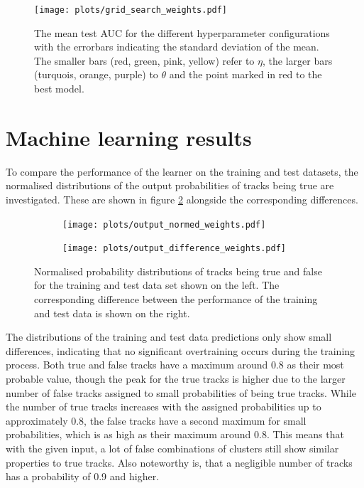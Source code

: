 \begin{figure}[H]
  \centering
  \texttt{[image: plots/grid\_search\_weights.pdf]}
  \caption{The mean test AUC for the different hyperparameter configurations with the errorbars indicating the standard deviation of the mean. The
  smaller bars (red, green, pink, yellow) refer to $\eta$, the larger bars (turquois, orange, purple) to $\theta$ and the point marked in red to the best model.}
  \label{fig:grid}
\end{figure}



\section{Machine learning results}
To compare the performance of the learner on the training and test datasets, the normalised distributions of the output probabilities of tracks being true are investigated.
These are shown in figure \ref{fig:output} alongside the corresponding differences.

\begin{figure}
  \hspace{-0.45cm}
  \begin{subfigure}{0.51\textwidth}
      \centering
      \texttt{[image: plots/output\_normed\_weights.pdf]}
  \end{subfigure}
  \begin{subfigure}{0.51\textwidth}
      \hspace{-0.15cm}
      \texttt{[image: plots/output\_difference\_weights.pdf]}
  \end{subfigure}
  \caption{Normalised probability distributions of tracks being true and false for the training and test data set shown on the left.
  The corresponding difference between the performance of the training and test data is shown on the right.}
  \label{fig:output}
\end{figure}

The distributions of the training and test data predictions only show small differences, indicating that no significant overtraining occurs during the training process.
Both true and false tracks have a maximum around 0.8 as their most probable value, though the peak for the true tracks is higher due to the larger number
of false tracks assigned to small probabilities of being true tracks. While the number of true tracks increases with the assigned probabilities up to
approximately 0.8, the false tracks have a second maximum for small probabilities, which is as high as their maximum around 0.8.
This means that
with the given input, a lot of false combinations of clusters still show similar properties to true tracks.
Also noteworthy is, that a negligible number of tracks has a probability of 0.9 and higher.

